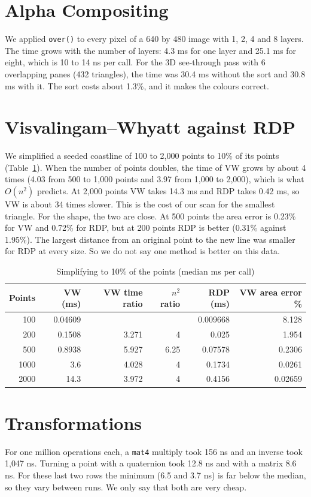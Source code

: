 \section{Alpha Compositing}
We applied \texttt{over()} to every pixel of a 640 by 480 image with 1, 2, 4 and 8 layers. The time grows with the number of layers: 4.3 ms for one layer and 25.1 ms for eight, which is 10 to 14 ns per call. For the 3D see-through pass with 6 overlapping panes (432 triangles), the time was 30.4 ms without the sort and 30.8 ms with it. The sort costs about 1.3\%, and it makes the colours correct.

\section{Visvalingam--Whyatt against RDP}
We simplified a seeded coastline of 100 to 2,000 points to 10\% of its points (Table~\ref{tab:vw}). When the number of points doubles, the time of VW grows by about 4 times (4.03 from 500 to 1,000 points and 3.97 from 1,000 to 2,000), which is what $O(n^2)$ predicts. At 2,000 points VW takes 14.3 ms and RDP takes 0.42 ms, so VW is about 34 times slower. This is the cost of our scan for the smallest triangle. For the shape, the two are close. At 500 points the area error is 0.23\% for VW and 0.72\% for RDP, but at 200 points RDP is better (0.31\% against 1.95\%). The largest distance from an original point to the new line was smaller for RDP at every size. So we do not say one method is better on this data.

\begin{table}[H]
\centering
\caption{Simplifying to 10\% of the points (median ms per call)}
\label{tab:vw}
\small
\begin{tabular}{@{}rrrrrr@{}}
\toprule
Points & VW (ms) & VW time ratio & $n^2$ ratio & RDP (ms) & VW area error \%\\
\midrule
100 & 0.04609 & & & 0.009668 & 8.128\\
200 & 0.1508 & 3.271 & 4 & 0.025 & 1.954\\
500 & 0.8938 & 5.927 & 6.25 & 0.07578 & 0.2306\\
1000 & 3.6 & 4.028 & 4 & 0.1734 & 0.0261\\
2000 & 14.3 & 3.972 & 4 & 0.4156 & 0.02659\\
\bottomrule
\end{tabular}
\end{table}

\section{Transformations}
For one million operations each, a \texttt{mat4} multiply took 156 ns and an inverse took 1,047 ns. Turning a point with a quaternion took 12.8 ns and with a matrix 8.6 ns. For these last two rows the minimum (6.5 and 3.7 ns) is far below the median, so they vary between runs. We only say that both are very cheap.

